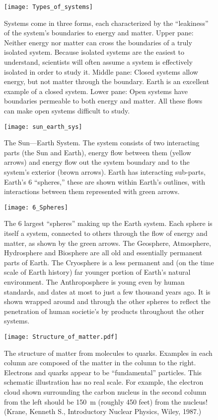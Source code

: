 \begin{figure}[p]
\centering
\texttt{[image: Types\_of\_systems]}%
\caption{Systems come in three forms, each characterized by the ``leakiness'' of the system's boundaries to energy and matter. Upper pane: Neither energy nor matter can cross the boundaries of a truly isolated system. Because isolated systems are the easiest to understand, scientists will often assume a system is effectively isolated in order to study it. Middle pane: Closed systems allow energy, but not matter through the boundary. Earth is an excellent example of a closed system. Lower pane: Open systems have boundaries permeable to both energy and matter. All these flows can make open systems difficult to study.}
\label{fig:sys_types}
\end{figure}

\begin{figure}[p]
\centering
\texttt{[image: sun\_earth\_sys]}%
\caption{The Sun---Earth System. The system consists of two interacting parts (the Sun and Earth), energy flow between them (yellow arrows) and energy flow out the system boundary and to the system's exterior (brown arrows). Earth has interacting sub-parts, Earth's 6 ``spheres,'' these are shown within Earth's outlines, with interactions between them represented with green arrows.}
\label{fig:sun_earth_sys}
\end{figure}

\begin{figure}[p]
\centering
\texttt{[image: 6\_Spheres]}%
\caption{The 6 largest ``spheres'' making up the Earth system. Each sphere is itself a system, connected to others through the flow of energy and matter, as shown by the green arrows. The Geosphere, Atmosphere, Hydrosphere and Biosphere are all old and essentially permanent parts of Earth. The Cryosphere is a less  permanent and (on the time scale of Earth  history) far younger portion of Earth's natural environment. The Anthroposphere is young even by human standards, and dates at most to just a few thousand years ago. It is shown wrapped around and through the other spheres to reflect the penetration of human societie's by products throughout the other systems.}
\label{fig:6_spheres}
\end{figure} 

\begin{figure}[p]
\centering
\texttt{[image: Structure\_of\_matter.pdf]}%
\caption{The structure of matter from molecules to quarks. Examples in each column are composed of the matter in the column to the right. Electrons and quarks appear to be ``fundamental'' particles. This schematic illustration has no real scale. For example, the electron cloud shown surrounding the carbon nucleus in the second column from the left should be \SI{150}{m} (roughly 450 feet) from the nucleus! (Krane, Kenneth S., Introductory Nuclear Physics, Wiley, 1987.) }
\label{fig:matter_struct}
\end{figure}

